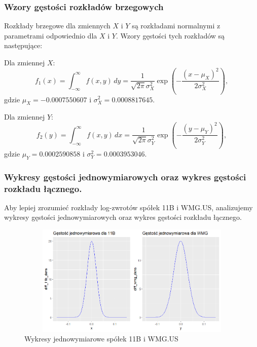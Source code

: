 \documentclass[a4paper,11pt]{article}
\begin{document}
\subsubsection*{Wzory gęstości rozkładów brzegowych}

Rozkłady brzegowe dla zmiennych \( X \) i \( Y \) są rozkładami normalnymi z parametrami odpowiednio dla \( X \) i \( Y \). Wzory gęstości tych rozkładów są następujące:

Dla zmiennej \( X \):
\[
f_1(x) = \int_{-\infty}^{\infty} f(x, y) \, dy = \frac{1}{\sqrt{2\pi}\sigma_X^2} \exp\left(-\frac{(x-\mu_X)^2}{2\sigma_X^2}\right),
\]
gdzie \( \mu_X = -0.0007550607 \) i \( \sigma_X^2 = 0.0008817645 \).

Dla zmiennej \( Y \):
\[
f_2(y) = \int_{-\infty}^{\infty} f(x, y) \, dx = \frac{1}{\sqrt{2\pi}\sigma_Y^2} \exp\left(-\frac{(y-\mu_Y)^2}{2\sigma_Y^2}\right),
\]
gdzie \( \mu_Y = 0.0002590858 \) i \( \sigma_Y^2 = 0.0003953046 \).

\subsubsection*{Wykresy gęstości jednowymiarowych oraz wykres gęstości rozkładu
łącznego.}
Aby lepiej zrozumieć rozkłady log-zwrotów spółek 11B i WMG.US, analizujemy wykresy gęstości jednowymiarowych oraz wykres gęstości rozkładu łącznego.

\begin{figure}[h]
\centering
\includegraphics[width=16cm, height=5.333cm]{img/diff_wykresy_jednowymiarowe.png}
\caption{Wykresy jednowymiarowe spółek 11B i WMG.US}
\end{figure}
\end{document}
